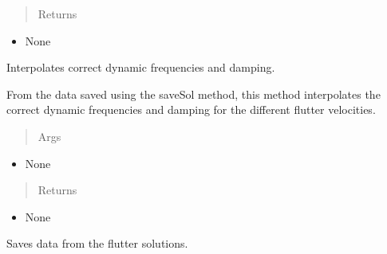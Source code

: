 \documentclass[letterpaper,10pt,english]{sphinxmanual}
\begin{document}
\begin{fulllineitems}
\begin{fulllineitems}
\begin{itemize}
\begin{description}
\end{description}

\end{itemize}
\begin{quote}\begin{description}
\item[{Returns}] \leavevmode
\end{description}\end{quote}
\begin{itemize}
\item {} 
None

\end{itemize}

\end{fulllineitems}


\begin{fulllineitems}
\label{FEM:AeroComBAT.FEM.FlutterPoint.interpOmegaRoot}
Interpolates correct dynamic frequencies and damping.

From the data saved using the saveSol method, this method interpolates
the correct dynamic frequencies and damping for the different flutter
velocities.
\begin{quote}\begin{description}
\item[{Args}] \leavevmode
\end{description}\end{quote}
\begin{itemize}
\item {} 
None

\end{itemize}
\begin{quote}\begin{description}
\item[{Returns}] \leavevmode
\end{description}\end{quote}
\begin{itemize}
\item {} 
None

\end{itemize}

\end{fulllineitems}


\begin{fulllineitems}
\label{FEM:AeroComBAT.FEM.FlutterPoint.saveSol}
Saves data from the flutter solutions.


\end{fulllineitems}
\end{fulllineitems}
\end{document}
